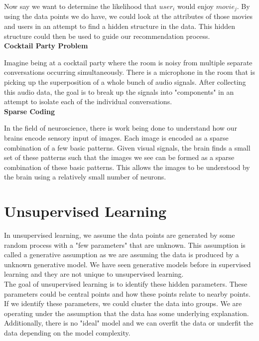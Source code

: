 \documentclass[english,course]{Notes}
\begin{document}
Now say we want to determine the likelihood that $user_i$ would enjoy $movie_j$. By using the data points we do have, we could look at the attributes of those movies and users in an attempt to find a hidden structure in the data. This hidden structure could then be used to guide our recommendation process. \\

\textbf{Cocktail Party Problem}

Imagine being at a cocktail party where the room is noisy from multiple separate conversations occurring simultaneously. There is a microphone in the room that is picking up the superposition of a whole bunch of audio signals. After collecting this audio data, the goal is to break up the signals into "components" in an attempt to isolate each of the individual conversations. \\

\textbf{Sparse Coding}

In the field of neuroscience, there is work being done to understand how our brains encode sensory input of images. Each image is encoded as a sparse combination of a few basic patterns. Given visual signals, the brain finds a small set of these patterns such that the images we see can be formed as a sparse combination of these basic patterns. This allows the images to be understood by the brain using a relatively small number of neurons.

\section{Unsupervised Learning}

In unsupervised learning, we assume the data points are generated by some random process with a "few parameters" that are unknown. This assumption is called a generative assumption as we are assuming the data is produced by a unknown generative model. We have seen generative models before in supervised learning and they are not unique to unsupervised learning. \\

The goal of unsupervised learning is to identify these hidden parameters. These parameters could be central points and how these points relate to nearby points. If we identify these parameters, we could cluster the data into groups. We are operating under the assumption that the data has some underlying explanation. Additionally, there is no "ideal" model and we can overfit the data or underfit the data depending on the model complexity. 
\end{document}
